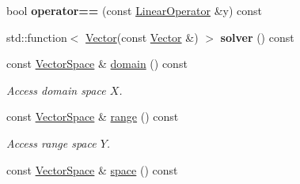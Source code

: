 \begin{DoxyCompactItemize}
\item 
bool {\bfseries operator==} (const \hyperlink{classSpacy_1_1LinearOperator}{Linear\+Operator} \&y) const \hypertarget{classSpacy_1_1LinearOperator_afbb3e1bce81ac646081f46fc3688313b}{}\label{classSpacy_1_1LinearOperator_afbb3e1bce81ac646081f46fc3688313b}

\item 
std\+::function$<$ \hyperlink{classSpacy_1_1Vector}{Vector}(const \hyperlink{classSpacy_1_1Vector}{Vector} \&) $>$ {\bfseries solver} () const \hypertarget{classSpacy_1_1LinearOperator_aeaadbe42f61f44a7019382fdcac0fa40}{}\label{classSpacy_1_1LinearOperator_aeaadbe42f61f44a7019382fdcac0fa40}

\item 
const \hyperlink{classSpacy_1_1VectorSpace}{Vector\+Space} \& \hyperlink{classSpacy_1_1LinearOperator_a1acd2a2f71a95baa2c364b88c4eee126}{domain} () const \hypertarget{classSpacy_1_1LinearOperator_a1acd2a2f71a95baa2c364b88c4eee126}{}\label{classSpacy_1_1LinearOperator_a1acd2a2f71a95baa2c364b88c4eee126}

\begin{DoxyCompactList}\small\item\em Access domain space $X$. \end{DoxyCompactList}\item 
const \hyperlink{classSpacy_1_1VectorSpace}{Vector\+Space} \& \hyperlink{classSpacy_1_1LinearOperator_a29653883e8ebc3460e9294e3bceee5bf}{range} () const \hypertarget{classSpacy_1_1LinearOperator_a29653883e8ebc3460e9294e3bceee5bf}{}\label{classSpacy_1_1LinearOperator_a29653883e8ebc3460e9294e3bceee5bf}

\begin{DoxyCompactList}\small\item\em Access range space $Y$. \end{DoxyCompactList}\item 
const \hyperlink{classSpacy_1_1VectorSpace}{Vector\+Space} \& \hyperlink{classSpacy_1_1LinearOperator_ad0116ec957dfb6bc490a4c9702929f8e}{space} () const \hypertarget{classSpacy_1_1LinearOperator_ad0116ec957dfb6bc490a4c9702929f8e}{}\label{classSpacy_1_1LinearOperator_ad0116ec957dfb6bc490a4c9702929f8e}


\end{DoxyCompactItemize}
